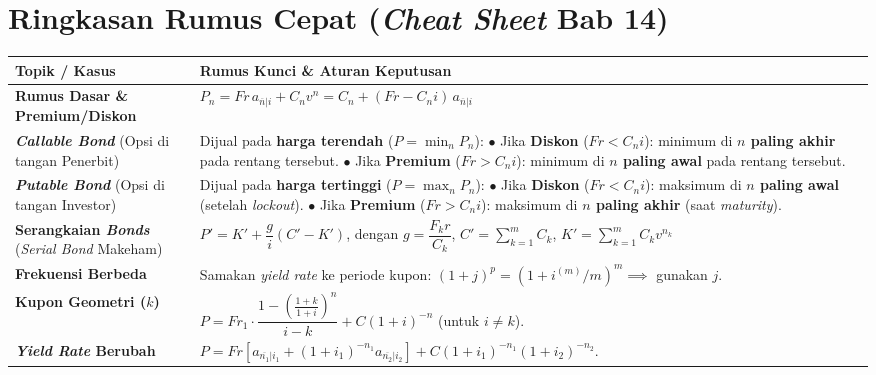 \documentclass[11pt,a4paper]{article}
\begin{document}
\section{Ringkasan Rumus Cepat (\textit{Cheat Sheet} Bab 14)}

\begin{center}
\renewcommand{\arraystretch}{1.45}
\begin{tabular}{p{4.2cm}p{10.2cm}}
\toprule
\textbf{Topik / Kasus} & \textbf{Rumus Kunci \& Aturan Keputusan} \\
\midrule
\textbf{Rumus Dasar \& Premium/Diskon} &
$P_n = Fr \, a_{\overline{n}|i} + C_n v^n = C_n + (Fr - C_n i)\,a_{\overline{n}|i}$ \\
\textbf{\textit{Callable Bond}} \newline (Opsi di tangan Penerbit) &
Dijual pada \textbf{harga terendah} ($P = \min_n P_n$):\newline
$\bullet$ Jika \textbf{Diskon} ($Fr < C_n i$): minimum di \textbf{$n$ paling akhir} pada rentang tersebut.\newline
$\bullet$ Jika \textbf{Premium} ($Fr > C_n i$): minimum di \textbf{$n$ paling awal} pada rentang tersebut. \\
\textbf{\textit{Putable Bond}} \newline (Opsi di tangan Investor) &
Dijual pada \textbf{harga tertinggi} ($P = \max_n P_n$):\newline
$\bullet$ Jika \textbf{Diskon} ($Fr < C_n i$): maksimum di \textbf{$n$ paling awal} (setelah \textit{lockout}).\newline
$\bullet$ Jika \textbf{Premium} ($Fr > C_n i$): maksimum di \textbf{$n$ paling akhir} (saat \textit{maturity}). \\
\textbf{Serangkaian \textit{Bonds}} \newline (\textit{Serial Bond} Makeham) &
$P' = K' + \dfrac{g}{i}(C' - K')$, \quad dengan $g = \dfrac{F_k r}{C_k}$, \quad $C' = \sum_{k=1}^m C_k$, \quad $K' = \sum_{k=1}^m C_k v^{n_k}$ \\
\textbf{Frekuensi Berbeda} &
Samakan \textit{yield rate} ke periode kupon: $\left(1 + j\right)^p = (1 + i^{(m)}/m)^m \implies$ gunakan $j$. \\
\textbf{Kupon Geometri ($k$)} &
$P = Fr_1 \cdot \dfrac{1 - \left(\frac{1+k}{1+i}\right)^n}{i - k} + C(1+i)^{-n}$ \quad (untuk $i \neq k$). \\
\textbf{\textit{Yield Rate} Berubah} &
$P = Fr\left[a_{\overline{n_1}|i_1} + (1+i_1)^{-n_1}a_{\overline{n_2}|i_2}\right] + C(1+i_1)^{-n_1}(1+i_2)^{-n_2}$. \\
\bottomrule
\end{tabular}
\end{center}
\end{document}
